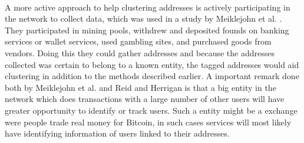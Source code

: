 \paragraph{}
A more active approach to help clustering addresses is actively participating in the network to collect data, which was used in a study by Meiklejohn et al. \cite{meiklejohn2013fistful}. They participated in mining pools, withdrew and deposited founds on banking services or wallet services, used gambling sites, and purchased goods from vendors. Doing this they could gather addresses and because the addresses collected was certain to belong to a known entity, the tagged addresses would aid clustering in addition to the methods described earlier.
A important remark done both by Meiklejohn et al.\cite{meiklejohn2013fistful} and Reid and Herrigan \cite{reid2013analysis} is that a big entity in the network which does transactions with a large number of other users will have greater opportunity to identify or track users. Such a entity might be a exchange were people trade real money for Bitcoin, in such cases services will most likely have identifying information of users linked to their addresses.


